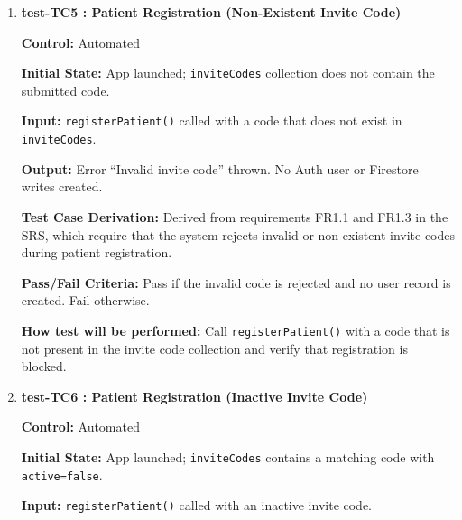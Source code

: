 \documentclass[12pt, titlepage]{article}
\begin{document}
\begin{enumerate}
	\textbf{Test Case Derivation:} Derived from requirements FR1.1, FR1.3, FR2, and FR3 in the SRS, which state that patients must register using valid invite codes and be linked to a physiotherapist.
	
	\textbf{Pass/Fail Criteria:} Pass if the patient account is created, the linked physiotherapist is stored, and the invite code is marked as used. Fail otherwise.
	
	\textbf{How test will be performed:} Call \texttt{registerPatient()} with a valid invite code and verify account creation, Firestore data, and invite code update behaviour.
	
	
	\vspace{0.5em}
	
	\item \textbf{test-TC5 : Patient Registration (Non-Existent Invite Code)}
	
	\textbf{Control:} Automated
	
	\textbf{Initial State:} App launched; \texttt{inviteCodes} collection does not contain the submitted code.
	
	\textbf{Input:} \texttt{registerPatient()} called with a code that does not exist in \texttt{inviteCodes}.
	
	\textbf{Output:} Error ``Invalid invite code'' thrown. No Auth user or Firestore writes created.
	
	\textbf{Test Case Derivation:} Derived from requirements FR1.1 and FR1.3 in the SRS, which require that the system rejects invalid or non-existent invite codes during patient registration.
	
	\textbf{Pass/Fail Criteria:} Pass if the invalid code is rejected and no user record is created. Fail otherwise.
	
	\textbf{How test will be performed:} Call \texttt{registerPatient()} with a code that is not present in the invite code collection and verify that registration is blocked.
	
	
	\vspace{0.5em}
	
	\item \textbf{test-TC6 : Patient Registration (Inactive Invite Code)}
	
	\textbf{Control:} Automated
	
	\textbf{Initial State:} App launched; \texttt{inviteCodes} contains a matching code with \texttt{active=false}.
	
	\textbf{Input:} \texttt{registerPatient()} called with an inactive invite code.
	

\end{enumerate}
\end{document}
